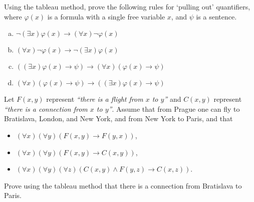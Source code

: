 \begin{problem}
    
    Using the tableau method, prove the following rules for `pulling out' quantifiers, where $\varphi(x)$ is a formula with a single free variable $x$, and $\psi$ is a sentence.

    \vspace{-9pt}
    \begin{multicols}{2}
        \begin{enumerate}[(a)]        
            \item $\neg(\exists x)\varphi(x)\to (\forall x)\neg \varphi(x)$
            \item $(\forall x)\neg \varphi(x)\to \neg(\exists x)\varphi(x)$
            \item $((\exists x)\varphi(x)\to\psi)\to(\forall x)(\varphi(x)\to \psi)$       
            \item $(\forall x)(\varphi(x)\to\psi)\to((\exists x)\varphi(x)\to \psi)$            
        \end{enumerate}
    \end{multicols}
    \vspace{-9pt}
    
\end{problem}


\begin{problem} 
    
    Let $F(x,y)$ represent \emph{``there is a flight from $x$ to $y$''} and $C(x,y)$ represent \emph{``there is a connection from $x$ to $y$''}. Assume that from Prague one can fly to Bratislava, London, and New York, and from New York to Paris, and that
    \begin{itemize}  
        \item $(\forall x)(\forall y)(F(x,y) \to F(y,x))$,
        \item $(\forall x)(\forall y)(F(x,y)\to C(x,y))$,
        \item $(\forall x)(\forall y)(\forall z)(C(x,y)\wedge F(y,z)\to C(x,z))$.
    \end{itemize}
    Prove using the tableau method that there is a connection from Bratislava to Paris.

\end{problem}



